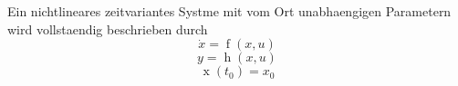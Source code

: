 Ein nichtlineares zeitvariantes Systme mit vom Ort unabhaengigen Parametern wird vollstaendig beschrieben durch
$$\dot{x} = \operatorname{f}(x, u)$$
$$y = \operatorname{h}(x, u)$$
$$\operatorname{x}(t_0) = x_0$$
